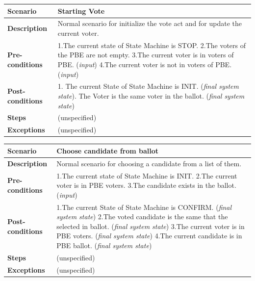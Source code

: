 \documentclass{article}
\begin{document}
\begin{center}
    \begin{tabular}{ | l | p{9cm} |}
    \hline
   \textbf{Scenario}	& \textbf{Starting Vote}  \\ \hline
    \textbf{Description}	& Normal scenario for initialize the vote act and for update the current voter. \\ \hline
   \textbf{Pre-conditions}	& 1.The current state of State Machine is STOP.\linebreak
2.The voters of the PBE are not empty.\linebreak
3.The current voter is in voters of PBE. (\textit{input})\linebreak
4.The current voter is not in voters of PBE. (\textit{input})
\\ \hline
 \textbf{Post-conditions} &	1.	The current State of State Machine is INIT. (\textit{final system state})\linebreak
2.	The Voter is the same voter in the ballot. (\textit{final system state})
   \\ \hline
   \textbf{Steps} &	(unspecified) \\ 
    \hline
\textbf{Exceptions}& 	(unspecified)
 \\ 
    \hline
    \end{tabular}
\end{center}

\begin{center}
    \begin{tabular}{ | l | p{9cm} |}
    \hline
   \textbf{Scenario}	& \textbf{Choose candidate from ballot}  \\ \hline
    \textbf{Description}	& Normal scenario for choosing a candidate from a list of them. \\ \hline
   \textbf{Pre-conditions}	& 1.The current state of State Machine is INIT.\linebreak
2.The current voter is in PBE voters.\linebreak
3.The candidate exists in the ballot.
 (\textit{input})
\\ \hline
 \textbf{Post-conditions} &1.The current State of State Machine is CONFIRM. (\textit{final system state})\linebreak
2.The voted candidate is the same that the selected in ballot. (\textit{final system state})\linebreak
3.The current voter is in PBE voters. (\textit{final system state})\linebreak
4.The current candidate is in PBE ballot. (\textit{final system state})

   \\ \hline
   \textbf{Steps} &	(unspecified) \\ 
    \hline
\textbf{Exceptions}& 	(unspecified)
 \\ 
    \hline
    \end{tabular}
\end{center}
\end{document}
